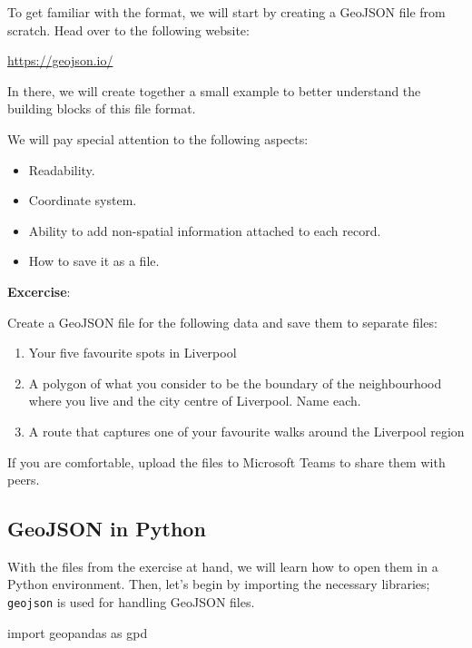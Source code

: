\documentclass[
  letterpaper,
  DIV=11,
  numbers=noendperiod]{scrreprt}
\newenvironment{Shaded}{\begin{snugshade}}{\end{snugshade}}
\newcommand{\ImportTok}[1]{\textcolor[rgb]{0.00,0.46,0.62}{#1}}
\newcommand{\NormalTok}[1]{\textcolor[rgb]{0.00,0.23,0.31}{#1}}
\providecommand{\tightlist}{%
  \setlength{\itemsep}{0pt}\setlength{\parskip}{0pt}}\usepackage{longtable,booktabs,array}
\begin{document}
To get familiar with the format, we will start by creating a GeoJSON
file from scratch. Head over to the following website:

\url{https://geojson.io/}

In there, we will create together a small example to better understand
the building blocks of this file format.

We will pay special attention to the following aspects:

\begin{itemize}
\tightlist
\item
  Readability.
\item
  Coordinate system.
\item
  Ability to add non-spatial information attached to each record.
\item
  How to save it as a file.
\end{itemize}

\textbf{Excercise}:

Create a GeoJSON file for the following data and save them to separate
files:

\begin{enumerate}
\def\labelenumi{\arabic{enumi}.}
\tightlist
\item
  Your five favourite spots in Liverpool
\item
  A polygon of what you consider to be the boundary of the neighbourhood
  where you live and the city centre of Liverpool. Name each.
\item
  A route that captures one of your favourite walks around the Liverpool
  region
\end{enumerate}

If you are comfortable, upload the files to Microsoft Teams to share
them with peers.

\hypertarget{geojson-in-python}{%
\subsection{GeoJSON in Python}\label{geojson-in-python}}

With the files from the exercise at hand, we will learn how to open them
in a Python environment. Then, let's begin by importing the necessary
libraries; \texttt{geojson} is used for handling GeoJSON files.

\begin{Shaded}
\begin{Highlighting}[]
\ImportTok{import}\NormalTok{ geopandas }\ImportTok{as}\NormalTok{ gpd}
\end{Highlighting}
\end{Shaded}
\end{document}
